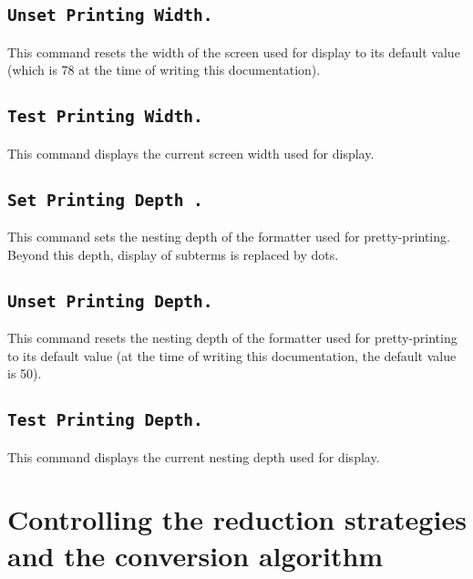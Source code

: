 \subsection[\tt Unset Printing Width.]{\tt Unset Printing Width.}
This command resets the width of the screen used for display to its
default value (which is 78 at the time of writing this documentation).

\subsection[\tt Test Printing Width.]{\tt Test Printing Width.}
This command displays the current screen width used for display.

\subsection[\tt Set Printing Depth {\integer}.]{\tt Set Printing Depth {\integer}.}
This command sets the nesting depth of the formatter used for
pretty-printing. Beyond this depth, display of subterms is replaced by
dots. 

\subsection[\tt Unset Printing Depth.]{\tt Unset Printing Depth.}
This command resets the nesting depth of the formatter used for
pretty-printing to its default value (at the
time of writing this documentation, the default value is 50).

\subsection[\tt Test Printing Depth.]{\tt Test Printing Depth.}
This command displays the current nesting depth used for display.


\section{Controlling the reduction strategies and the conversion algorithm}
\label{Controlling reduction strategy}

